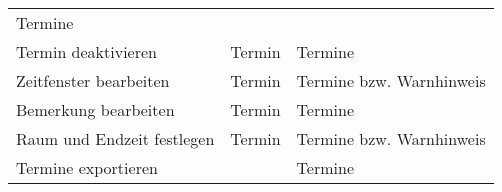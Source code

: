 \documentclass[]{article}
\begin{document}
\begin{longtable}[]{@{}lll@{}}
\begin{minipage}[t]{0.24\columnwidth}
Termine\strut
\end{minipage}\tabularnewline
\begin{minipage}[t]{0.40\columnwidth}\raggedright
Termin deaktivieren\strut
\end{minipage} & \begin{minipage}[t]{0.27\columnwidth}\raggedright
Termin\strut
\end{minipage} & \begin{minipage}[t]{0.24\columnwidth}\raggedright
Termine\strut
\end{minipage}\tabularnewline
\begin{minipage}[t]{0.40\columnwidth}\raggedright
Zeitfenster bearbeiten\strut
\end{minipage} & \begin{minipage}[t]{0.27\columnwidth}\raggedright
Termin\strut
\end{minipage} & \begin{minipage}[t]{0.24\columnwidth}\raggedright
Termine bzw. Warnhinweis\strut
\end{minipage}\tabularnewline
\begin{minipage}[t]{0.40\columnwidth}\raggedright
Bemerkung bearbeiten\strut
\end{minipage} & \begin{minipage}[t]{0.27\columnwidth}\raggedright
Termin\strut
\end{minipage} & \begin{minipage}[t]{0.24\columnwidth}\raggedright
Termine\strut
\end{minipage}\tabularnewline
\begin{minipage}[t]{0.40\columnwidth}\raggedright
Raum und Endzeit festlegen\strut
\end{minipage} & \begin{minipage}[t]{0.27\columnwidth}\raggedright
Termin\strut
\end{minipage} & \begin{minipage}[t]{0.24\columnwidth}\raggedright
Termine bzw. Warnhinweis\strut
\end{minipage}\tabularnewline
\begin{minipage}[t]{0.40\columnwidth}\raggedright
Termine exportieren\strut
\end{minipage} & \begin{minipage}[t]{0.27\columnwidth}\raggedright
\strut
\end{minipage} & \begin{minipage}[t]{0.24\columnwidth}\raggedright
Termine\strut
\end{minipage}\tabularnewline

\end{longtable}
\end{document}
